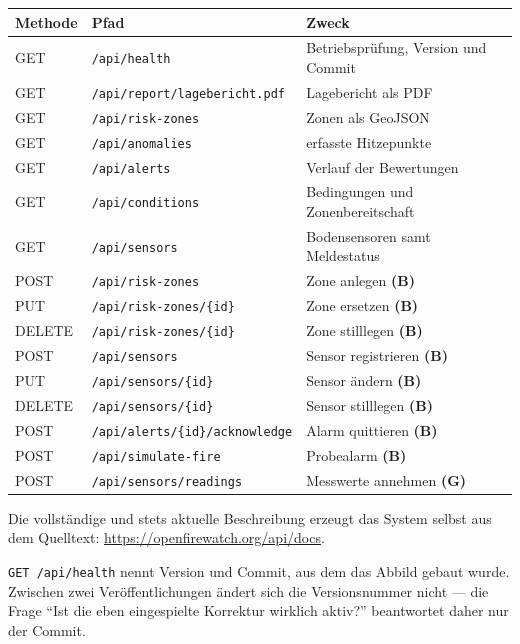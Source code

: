 \documentclass[11pt,a4paper,DIV=12,parskip=half]{scrartcl}
\begin{document}
\begin{center}
\begin{tabularx}{\textwidth}{@{}l l X@{}}
\toprule
\textbf{Methode} & \textbf{Pfad} & \textbf{Zweck} \\
\midrule
GET & \texttt{/api/health} & Betriebsprüfung, Version und Commit \\
GET & \texttt{/api/report/lagebericht.pdf} & Lagebericht als PDF \\
GET & \texttt{/api/risk-zones} & Zonen als GeoJSON \\
GET & \texttt{/api/anomalies} & erfasste Hitzepunkte \\
GET & \texttt{/api/alerts} & Verlauf der Bewertungen \\
GET & \texttt{/api/conditions} & Bedingungen und Zonenbereitschaft \\
GET & \texttt{/api/sensors} & Bodensensoren samt Meldestatus \\
POST & \texttt{/api/risk-zones} & Zone anlegen \quad\textbf{(B)} \\
PUT & \texttt{/api/risk-zones/\{id\}} & Zone ersetzen \quad\textbf{(B)} \\
DELETE & \texttt{/api/risk-zones/\{id\}} & Zone stilllegen \quad\textbf{(B)} \\
POST & \texttt{/api/sensors} & Sensor registrieren \quad\textbf{(B)} \\
PUT & \texttt{/api/sensors/\{id\}} & Sensor ändern \quad\textbf{(B)} \\
DELETE & \texttt{/api/sensors/\{id\}} & Sensor stilllegen \quad\textbf{(B)} \\
POST & \texttt{/api/alerts/\{id\}/acknowledge} & Alarm quittieren \quad\textbf{(B)} \\
POST & \texttt{/api/simulate-fire} & Probealarm \quad\textbf{(B)} \\
POST & \texttt{/api/sensors/readings} & Messwerte annehmen \quad\textbf{(G)} \\
\bottomrule
\end{tabularx}
\end{center}

Die vollständige und stets aktuelle Beschreibung erzeugt das System selbst aus
dem Quelltext: \url{https://openfirewatch.org/api/docs}.

\begin{hinweis}
\texttt{GET /api/health} nennt Version und Commit, aus dem das Abbild gebaut
wurde. Zwischen zwei Veröffentlichungen ändert sich die Versionsnummer nicht
--- die Frage \enquote{Ist die eben eingespielte Korrektur wirklich aktiv?}
beantwortet daher nur der Commit.
\end{hinweis}
\end{document}
